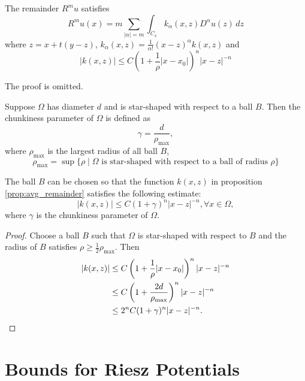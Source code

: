 \documentclass{article}
\begin{document}
\begin{proposition}\label{prop:avg_remainder}
    The remainder $R^m u$ satisfies
    \begin{equation}
        R^m u(x) = m \sum_{|\alpha| = m} \int_{C_x} k_{\alpha}(x,z) D^\alpha u(z)\,dz
    \end{equation}
    where $z = x + t(y-z)$, $k_{\alpha}(x,z) = \frac{1}{\alpha !}(x-z)^{\alpha} k(x,z)$ and
    \begin{equation}
        \vert k(x,z) \vert \le C \left( 1 + \frac{1}{\rho}|x-x_0|\right)^n |x-z|^{-n}
    \end{equation}
\end{proposition}
The proof is omitted.


\begin{definition}
    Suppose $\Omega$ has diameter $d$ and is star-shaped with respect to a ball $B$.
    Then the chunkiness parameter of $\Omega$ is defined as
    \[
        \gamma = \frac{d}{\rho_{\max}},
    \]
    where $\rho_{\max}$ is the largest radius of all ball $B$,
    \[
        \rho_{\max} = \sup \{\rho \mid \text{$\Omega$ is star-shaped with respect to a ball of radius $\rho$}\}
    \]
\end{definition}

\begin{corollary}
    The ball $B$ can be chosen so that the function $k(x,z)$ in proposition \ref{prop:avg_remainder}
    satisfies the following estimate:
    \begin{equation}
        |k(x,z)| \le C(1+\gamma)^n |x-z|^{-n}, \forall x \in \Omega,
    \end{equation}
    where $\gamma$ is the chunkiness parameter of $\Omega$.
\end{corollary}
\begin{proof}
    Choose a ball $B$ such that $\Omega$ is star-shaped with respect to $B$ and the radius of $B$ satisfies $\rho \ge \frac12 \rho_{\max}$.
    Then
    \begin{align}
        \vert k(x,z) \vert \le{} & C \left( 1 + \frac{1}{\rho}|x-x_0|\right)^n |x-z|^{-n} \notag  \\
        \le{}                    & C \left( 1 + \frac{2d}{\rho_{\max}}\right)^n |x-z|^{-n} \notag \\
        \le{}                    & 2^n C (1+\gamma)^n |x-z|^{-n}.
    \end{align}
\end{proof}


\section{Bounds for Riesz Potentials}
\end{document}
